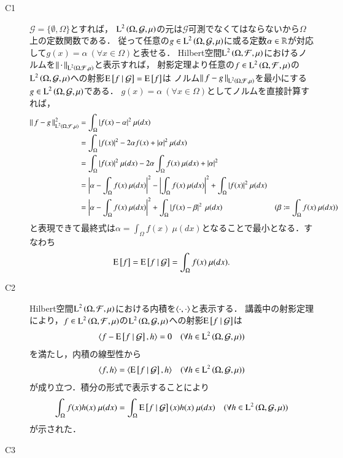 	\begin{prf}
		\begin{description}
			\item[C1] $\mathcal{G} = \{\emptyset, \Omega\}$とすれば，
				$\operatorname{L}^{2} \left(\Omega, \mathcal{G},\mu\right)$の元は$\mathcal{G}$可測でなくてはならないから$\Omega$上の定数関数である．
				従って任意の$g \in \operatorname{L}^{2} \left(\Omega, \mathcal{G},\mu\right)$に或る定数$\alpha \in \mathbb{R}$が対応して$g(x)=\alpha\ (\forall x \in \Omega)$と表せる．
				Hilbert空間$\operatorname{L}^{2} \left(\Omega, \mathcal{F},\mu\right)$におけるノルムを$\left\|\, \cdot\, \right\|_{\operatorname{L}^{2} \left(\Omega, \mathcal{F},\mu\right)}$と表示すれば，
				射影定理より任意の$f \in \operatorname{L}^{2} \left(\Omega, \mathcal{F},\mu\right)$の$\operatorname{L}^{2} \left(\Omega, \mathcal{G},\mu\right)$への射影$\operatorname{E} \left[ f \ \middle|\ \mathcal{G} \right] = \operatorname{E} \left[ f \right]$は
				ノルム$\left\|\, f-g\, \right\|_{\operatorname{L}^{2} \left(\Omega, \mathcal{F},\mu\right)}$を最小にする$g \in \operatorname{L}^{2} \left(\Omega, \mathcal{G},\mu\right)$である．
				$g(x)=\alpha\ (\forall x \in \Omega)$としてノルムを直接計算すれば，
				\begin{align}
					\left\|\, f-g\, \right\|_{\operatorname{L}^{2} \left(\Omega, \mathcal{F},\mu\right)}^2 &= \int_{\Omega} |f(x) - \alpha|^2\ \mu(dx) \\
					&= \int_{\Omega} |f(x)|^2 - 2 \alpha f(x) + |\alpha|^2\ \mu(dx) \\
					&= \int_{\Omega} |f(x)|^2\ \mu(dx) - 2 \alpha \int_{\Omega} f(x)\ \mu(dx) + |\alpha|^2 \\
					&= \left| \alpha - \int_{\Omega} f(x)\ \mu(dx) \right|^2 - \left| \int_{\Omega} f(x)\ \mu(dx) \right|^2 + \int_{\Omega} |f(x)|^2\ \mu(dx) \\
					&= \left| \alpha - \int_{\Omega} f(x)\ \mu(dx) \right|^2 + \int_{\Omega} \left| f(x) - \beta \right|^2\ \mu(dx) & (\beta \coloneqq \int_{\Omega} f(x)\ \mu(dx))
				\end{align}
				と表現できて最終式は$\alpha = \int_{\Omega} f(x)\ \mu(dx)$となることで最小となる．すなわち
				\begin{align}
					\operatorname{E} \left[ f \right] = \operatorname{E} \left[ f \ \middle|\ \mathcal{G} \right] = \int_{\Omega} f(x)\ \mu(dx).
				\end{align}
			
			\item[C2] Hilbert空間$\operatorname{L}^{2} \left(\Omega, \mathcal{F},\mu\right)$における内積を$\inprod<\cdot,\cdot>$と表示する．
				講義中の射影定理により，$f \in \operatorname{L}^{2} \left(\Omega, \mathcal{F},\mu\right)$の$\operatorname{L}^{2} \left(\Omega, \mathcal{G},\mu\right)$への射影$\operatorname{E} \left[ f \ \middle|\ \mathcal{G} \right]$は
				\begin{align}
					\inprod<f - \cexp{f}{\mathcal{G}}, h> = 0 \quad (\forall h \in \Lp{2}{\Omega, \mathcal{G},\mu})
				\end{align}
				を満たし，内積の線型性から
				\begin{align}
					\inprod<f, h> = \inprod<\cexp{f}{\mathcal{G}}, h> \quad (\forall h \in \Lp{2}{\Omega, \mathcal{G},\mu})
				\end{align}
				が成り立つ．積分の形式で表示することにより
				\begin{align}
					\int_{\Omega} f(x)h(x)\ \mu(dx) = \int_{\Omega} \operatorname{E} \left[ f \ \middle|\ \mathcal{G} \right](x)h(x)\ \mu(dx) \quad (\forall h \in \operatorname{L}^{2} \left(\Omega, \mathcal{G},\mu\right))
				\end{align}
				が示された．
				
			\item[C3] 
		\end{description}
	\end{prf}